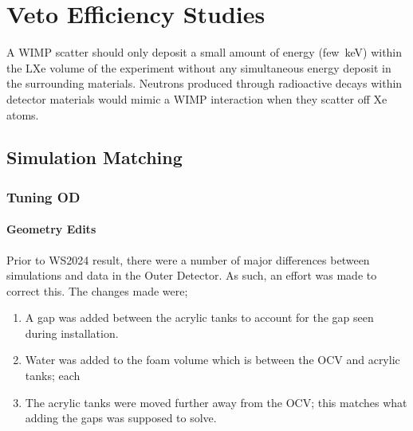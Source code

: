 \chapter{Veto Efficiency Studies}\label{chap:VetoEfficiency}
A WIMP scatter should only deposit a small amount of energy (few~keV) within the LXe volume of the experiment without any simultaneous energy deposit in the surrounding materials. Neutrons produced through radioactive decays within detector materials would mimic a WIMP interaction when they scatter off Xe atoms. 

\section{Simulation Matching}\label{sec:simulation_improvements}
\subsection{Tuning OD}
\subsubsection{Geometry Edits}\label{sec:GeometryEdits}
Prior to WS2024 result, there were a number of major differences between simulations and data in the Outer Detector. 
As such, an effort was made to correct this. 
The changes made were;
\begin{enumerate}
    \item A gap was added between the acrylic tanks to account for the gap seen during installation.
    \item Water was added to the foam volume which is between the OCV and acrylic tanks; each 
    \item The acrylic tanks were moved further away from the OCV; this matches what adding the gaps was supposed to solve.
\end{enumerate}

